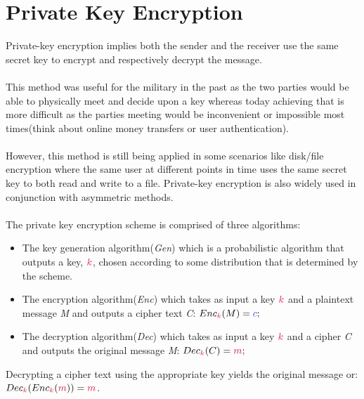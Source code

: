 \section{Private Key Encryption}

    Private-key encryption implies both the sender and the receiver use the same secret key to encrypt and respectively decrypt the message.\\
    \\
    This method was useful for the military in the past as the two parties would be able to physically meet and decide upon a key whereas today achieving that is more difficult as the parties meeting would be inconvenient or impossible most times(think about online money transfers or user authentication).\\
    \\
    However, this method is still being applied in some scenarios like disk/file encryption where the same user at different points in time uses the same secret key to both read and write to a file. Private-key encryption is also widely used in conjunction with asymmetric methods.\\
    \\
    The private key encryption scheme is comprised of three algorithms:
    
    \begin{itemize}
      \item The key generation algorithm(\textit{Gen}) which is a probabilistic algorithm that outputs a key, $\ck$, chosen according to some distribution that is determined by the scheme.
      \item The encryption algorithm(\textit{Enc}) which takes as input a key $\ck$ and a plaintext message \textit{M} and outputs a cipher text \textit{C}: $Enc_\ck(M) = \cc;$
      \item The decryption algorithm(\textit{Dec}) which takes as input a key $\ck$ and a cipher \textit{C} and outputs the original message \textit{M}: $Dec_\ck(C) = \cm;$
    \end{itemize}
    
    Decrypting a cipher text using the appropriate key yields the original message or: $Dec_\ck(Enc_\ck(\cm))=\cm$.
    \\
    
